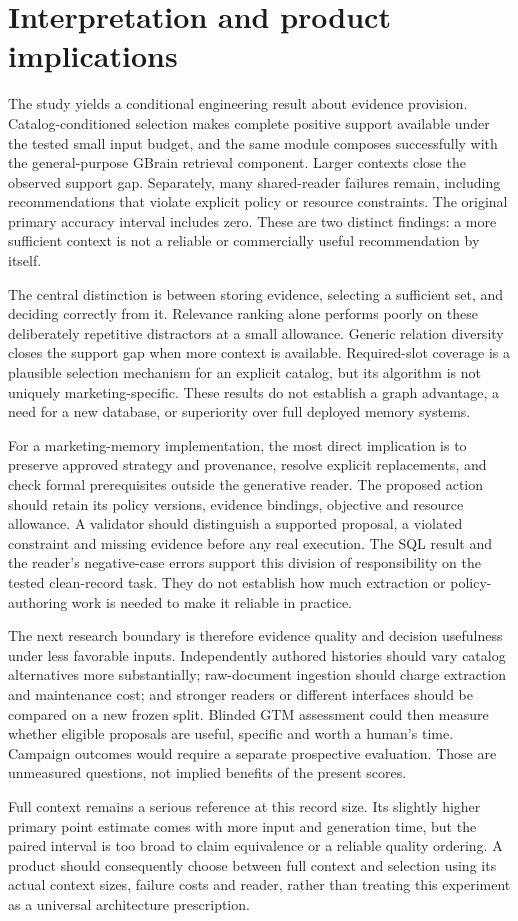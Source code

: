 \section{Interpretation and product implications}
The study yields a conditional engineering result about evidence provision. Catalog-conditioned selection makes complete positive support available under the tested small input budget, and the same module composes successfully with the general-purpose GBrain retrieval component. Larger contexts close the observed support gap. Separately, many shared-reader failures remain, including recommendations that violate explicit policy or resource constraints. The original primary accuracy interval includes zero. These are two distinct findings: a more sufficient context is not a reliable or commercially useful recommendation by itself.

The central distinction is between storing evidence, selecting a sufficient set, and deciding correctly from it. Relevance ranking alone performs poorly on these deliberately repetitive distractors at a small allowance. Generic relation diversity closes the support gap when more context is available. Required-slot coverage is a plausible selection mechanism for an explicit catalog, but its algorithm is not uniquely marketing-specific. These results do not establish a graph advantage, a need for a new database, or superiority over full deployed memory systems.

For a marketing-memory implementation, the most direct implication is to preserve approved strategy and provenance, resolve explicit replacements, and check formal prerequisites outside the generative reader. The proposed action should retain its policy versions, evidence bindings, objective and resource allowance. A validator should distinguish a supported proposal, a violated constraint and missing evidence before any real execution. The SQL result and the reader's negative-case errors support this division of responsibility on the tested clean-record task. They do not establish how much extraction or policy-authoring work is needed to make it reliable in practice.

The next research boundary is therefore evidence quality and decision usefulness under less favorable inputs. Independently authored histories should vary catalog alternatives more substantially; raw-document ingestion should charge extraction and maintenance cost; and stronger readers or different interfaces should be compared on a new frozen split. Blinded GTM assessment could then measure whether eligible proposals are useful, specific and worth a human's time. Campaign outcomes would require a separate prospective evaluation. Those are unmeasured questions, not implied benefits of the present scores.

Full context remains a serious reference at this record size. Its slightly higher primary point estimate comes with more input and generation time, but the paired interval is too broad to claim equivalence or a reliable quality ordering. A product should consequently choose between full context and selection using its actual context sizes, failure costs and reader, rather than treating this experiment as a universal architecture prescription.

